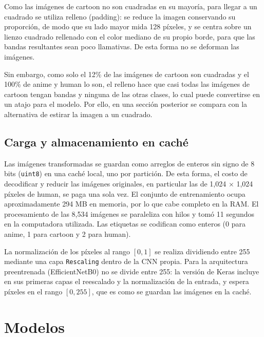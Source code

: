 \documentclass[letterpaper, 10 pt]{IEEEconf}
\begin{document}
Como las imágenes de cartoon no son cuadradas en su mayoría, para llegar a un cuadrado se utiliza relleno (padding): se reduce la imagen conservando su proporción, de modo que su lado mayor mida 128 píxeles, y se centra sobre un lienzo cuadrado rellenado con el color mediano de su propio borde, para que las bandas resultantes sean poco llamativas. De esta forma no se deforman las imágenes.

Sin embargo, como solo el 12\% de las imágenes de cartoon son cuadradas y el 100\% de anime y human lo son, el relleno hace que casi todas las imágenes de cartoon tengan bandas y ninguna de las otras clases, lo cual puede convertirse en un atajo para el modelo. Por ello, en una sección posterior se compara con la alternativa de estirar la imagen a un cuadrado.

\subsection{Carga y almacenamiento en caché}

Las imágenes transformadas se guardan como arreglos de enteros sin signo de 8 bits (\texttt{uint8}) en una caché local, uno por partición. De esta forma, el costo de decodificar y reducir las imágenes originales, en particular las de 1,024 $\times$ 1,024 píxeles de human, se paga una sola vez. El conjunto de entrenamiento ocupa aproximadamente 294 MB en memoria, por lo que cabe completo en la RAM. El procesamiento de las 8,534 imágenes se paraleliza con hilos y tomó 11 segundos en la computadora utilizada. Las etiquetas se codifican como enteros (0 para anime, 1 para cartoon y 2 para human).

La normalización de los píxeles al rango $[0,1]$ se realiza dividiendo entre 255 mediante una capa \texttt{Rescaling} dentro de la CNN propia. Para la arquitectura preentrenada (EfficientNetB0) no se divide entre 255: la versión de Keras incluye en sus primeras capas el reescalado y la normalización de la entrada, y espera píxeles en el rango $[0,255]$, que es como se guardan las imágenes en la caché.


\section{Modelos}
\end{document}
